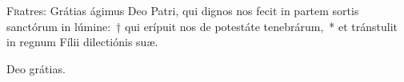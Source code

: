 \lettrine{F}{r}atres: Grátias ágimus Deo Patri, qui dignos nos fecit in partem sortis san\-ctórum in lúmine:~† qui erípuit nos de potestáte tenebrárum,~* et tránstulit in regnum Fílii dile\-ctiónis suæ.

\rr Deo grátias.